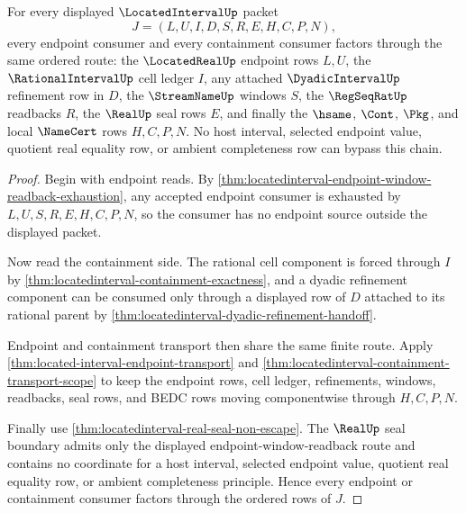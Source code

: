 \begin{theorem}
\label{thm:locatedinterval-endpoint-cell-seal-factorization}
For every displayed $\LocatedIntervalUp$ packet
$$
J=(L,U,I,D,S,R,E,H,C,P,N),
$$
every endpoint consumer and every containment consumer factors through the same ordered route: the $\LocatedRealUp$ endpoint rows $L,U$, the $\RationalIntervalUp$ cell ledger $I$, any attached $\DyadicIntervalUp$ refinement row in $D$, the $\StreamNameUp$ windows $S$, the $\RegSeqRatUp$ readbacks $R$, the $\RealUp$ seal rows $E$, and finally the $\hsame$, $\Cont$, $\Pkg$, and local $\NameCert$ rows $H,C,P,N$. No host interval, selected endpoint value, quotient real equality row, or ambient completeness row can bypass this chain.
\end{theorem}
\begin{proof}
Begin with endpoint reads. By \autoref{thm:locatedinterval-endpoint-window-readback-exhaustion}, any accepted endpoint consumer is exhausted by $L,U,S,R,E,H,C,P,N$, so the consumer has no endpoint source outside the displayed packet.

Now read the containment side. The rational cell component is forced through $I$ by \autoref{thm:locatedinterval-containment-exactness}, and a dyadic refinement component can be consumed only through a displayed row of $D$ attached to its rational parent by \autoref{thm:locatedinterval-dyadic-refinement-handoff}.

Endpoint and containment transport then share the same finite route. Apply \autoref{thm:located-interval-endpoint-transport} and \autoref{thm:locatedinterval-containment-transport-scope} to keep the endpoint rows, cell ledger, refinements, windows, readbacks, seal rows, and BEDC rows moving componentwise through $H,C,P,N$.

Finally use \autoref{thm:locatedinterval-real-seal-non-escape}. The $\RealUp$ seal boundary admits only the displayed endpoint-window-readback route and contains no coordinate for a host interval, selected endpoint value, quotient real equality row, or ambient completeness principle. Hence every endpoint or containment consumer factors through the ordered rows of $J$.
\end{proof}

